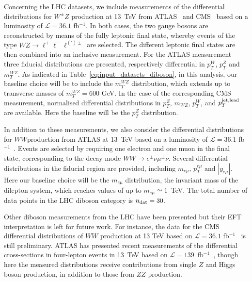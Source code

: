 

Concerning the LHC datasets, we include measurements of the differential
distributions for $W^{\pm}Z$ production at 13~TeV from
ATLAS~\cite{ATLAS-CONF-2018-034} and CMS~\cite{Sirunyan:2019bez} based on a
luminosity of $\mathcal{L}=36.1$ fb$^{-1}$. In both cases, the two gauge bosons
are reconstructed by means of the fully leptonic final state, whereby events
of the type  $WZ \to \ell^+ \ell^- \ell^{(')\pm}$ are selected.
%
The different leptonic final states are then combined into an inclusive
measurement. For the ATLAS measurement three fiducial distributions are
presented, respectively differential in $p_T^W$, $p_T^Z$ and $m_T^{WZ}$.
As indicated in Table~\ref{eq:input_datasets_diboson},
in this analysis, our baseline choice will be to include the $m_{T}^{WZ}$
distribution, which extends up to transverse masses of $m_{T}^{WZ}=600$ GeV.
In the case of the corresponding CMS measurement, normalised
differential distributions in $p_T^Z$, $m_{WZ}$,
$p_T^{W}$, and $p_T^{\rm jet,lead}$ are available.
Here the baseline will be the $p^Z_{T}$ distribution.

In addition to these measurements, we also consider
the differential distributions for $WW $production from ATLAS at 13~TeV
based on a luminosity of $\mathcal{L}=36.1$ fb$^{-1}$~\cite{Aaboud:2019nkz}.
Events are selected by requiring one electron
and one muon in the final state, corresponding to the decay
mode $WW \to e^\pm \nu \mu^\pm \nu$.
Several differential distributions in the fiducial
region are provided, including  $m_{e\mu}$,
$p_T^{e\mu}$ and $|y_{e\mu}|$.
%
Here our baseline choice will be the $m_{e\mu}$ distribution,
the invariant mass of the dilepton system, which reaches values
of up to $m_{e\mu}\simeq 1$~TeV.
%
The total number of  data points in the
LHC diboson category is $n_{\rm dat}=30$.

Other diboson measurements from the LHC have been presented but their EFT
interpretation is left for future work.
For instance, the data for the CMS differential distributions of $WW$ production
at 13 TeV based on $\mathcal{L}=36.1$ fb$^{-1}$~\cite{CMS-PAS-SMP-18-004} is
still preliminary.
ATLAS has presented recent measurements
of the differential cross-sections in four-lepton events in 13~TeV
based on $\mathcal{L}=139$~fb$^{-1}$~\cite{ATLAS:2020xtq}, though here the
measured
distributions receive contributions from single $Z$ and Higgs boson production,
in addition to those from $ZZ$ production.

